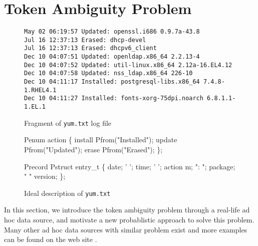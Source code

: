 \section{Token Ambiguity Problem} \label{sec:examples}
\begin{figure}[t]
\begin{center}
{\small
\begin{verbatim}
May 02 06:19:57 Updated: openssl.i686 0.9.7a-43.8
Jul 16 12:37:13 Erased: dhcp-devel
Jul 16 12:37:13 Erased: dhcpv6_client
Dec 10 04:07:51 Updated: openldap.x86_64 2.2.13-4
Dec 10 04:07:52 Updated: util-linux.x86_64 2.12a-16.EL4.12
Dec 10 04:07:58 Updated: nss_ldap.x86_64 226-10
Dec 10 04:11:17 Installed: postgresql-libs.x86_64 7.4.8-1.RHEL4.1
Dec 10 04:11:27 Installed: fonts-xorg-75dpi.noarch 6.8.1.1-1.EL.1
\end{verbatim}
}
\end{center}
\caption{Fragment of {\tt yum.txt} log file} \label{fig:yum}
\end{figure}

\begin{figure}[t]
\begin{minipage}[t]{0.5\columnwidth}
\begin{code}
Penum action \{
  install Pfrom("Installed");
  update Pfrom("Updated");
  erase Pfrom("Erased");
\};
\end{code}
\end{minipage}
\hfill
\begin{minipage}[t]{0.5\columnwidth}
\begin{code}
Precord Pstruct entry_t \{
   date;
  ' ';
   time;
  ' ';
  action m;
  ": ";
   package;
  " "
   version;
\};
\end{code}
\end{minipage}
\caption{Ideal \pads{} description of {\tt yum.txt}}\label{fig:yum-gold}
\end{figure}


In this section, we introduce the token ambiguity problem through
a real-life ad hoc data source, and motivate a new probablistic approach
to solve this problem. Many other ad hoc data sources with similar
problem exist and more examples can be found on the \pads{} web site \cite{padsweb}.

